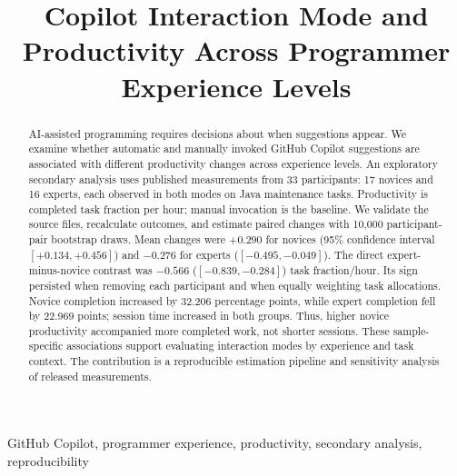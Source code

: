 \documentclass[conference]{IEEEtran}
\title{Copilot Interaction Mode and Productivity Across Programmer Experience Levels}
\author{\IEEEauthorblockN{Damir Makhmutov and Amir Kasimov}
\IEEEauthorblockA{Research Methods Course Project}}
\begin{document}
\maketitle
\begin{abstract}
AI-assisted programming requires decisions about when suggestions appear.
We examine whether automatic and manually invoked GitHub Copilot suggestions
are associated with different productivity changes across experience levels.
An exploratory secondary analysis uses published measurements from 33 participants:
17 novices and 16 experts, each observed in both modes on Java maintenance
tasks. Productivity is completed task fraction per hour; manual invocation is
the baseline. We validate the source files, recalculate outcomes, and estimate
paired changes with 10,000 participant-pair bootstrap draws. Mean changes were
$+0.290$ for novices (95\% confidence interval $[+0.134,+0.456]$) and
$-0.276$ for experts ($[-0.495,-0.049]$). The direct expert-minus-novice
contrast was $-0.566$ ($[-0.839,-0.284]$) task fraction/hour. Its sign persisted
when removing each participant and when equally weighting task allocations.
Novice completion increased by 32.206 percentage points, while expert completion
fell by 22.969 points; session time increased in both groups. Thus, higher
novice productivity accompanied more completed work, not shorter sessions.
These sample-specific associations support evaluating interaction modes by
experience and task context. The contribution is a reproducible estimation
pipeline and sensitivity analysis of released measurements.
\end{abstract}
\begin{IEEEkeywords}
GitHub Copilot, programmer experience, productivity, secondary analysis, reproducibility
\end{IEEEkeywords}






\balance


\end{document}
